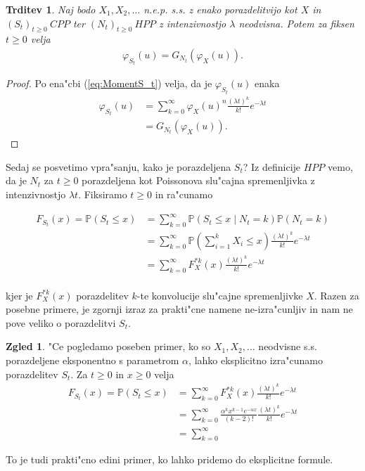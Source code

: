 \documentclass[12pt, a4paper, reqno]{amsart}
\theoremstyle{definition} %
\newtheorem{zgled}[definicija]{Zgled}
\theoremstyle{plain} %
\newtheorem{trditev}[definicija]{Trditev}
\newcommand{\Prob}{\mathbb{P}}
\newcommand{\1}{\mathds{1}}
\begin{document}
    \begin{trditev}
        Naj bodo $X_1, X_2, \dots$ n.e.p. s.s. z enako porazdelitvijo kot $X$ in
         $(S_t)_{t\geq 0}\ CPP$ ter $(N_t)_{t\geq 0}\ HPP$ z intenzivnostjo $\lambda$ neodvisna.
        Potem za fiksen $t\geq0$ velja
        \begin{align*}
            \varphi_{S_t}(u) = G_{N_t}\left(\varphi_{X}(u)\right).
        \end{align*}
        \label{trd:povezavaRodovneKarkateristicne}
    \end{trditev}

    \begin{proof}
        Po ena"cbi (\ref{eq:MomentS_t}) velja, da je $\varphi_{S_t}(u)$ enaka
        \begin{align*}
            \varphi_{S_t}(u) &= \sum_{k=0}^{\infty}
            \varphi_X(u)^n\frac{(\lambda t)^k}{k!}e^{-\lambda t} \\
            &= G_{N_t}\left(\varphi_X(u)\right).
        \end{align*}
    \end{proof}

    \noindent
    Sedaj se posvetimo vpra"sanju, kako je porazdeljena $S_t$? Iz definicije $HPP$ vemo, da je 
    $N_t$ za $t\geq0$ porazdeljena kot Poissonova slu"cajna spremenljivka z intenzivnostjo 
    $\lambda t$. Fiksiramo $t\geq0$ in ra"cunamo

    \begin{align*}
        F_{S_t}(x) = \Prob(S_t \leq x) 
        &= \sum_{k=0}^\infty \Prob(S_t \leq x \mid N_t = k)\Prob(N_t = k) \\
        & = \sum_{k=0}^\infty \Prob(\sum_{i=1}^k X_i \leq x)\frac{(\lambda t)^k}{k!}e^{-\lambda t} \\
        & = \sum_{k=0}^\infty F_X^{*k}(x)\frac{(\lambda t)^k}{k!}e^{-\lambda t} \\
    \end{align*}

    \noindent
    kjer je $F_X^{*k}(x)$ porazdelitev $k$-te konvolucije slu"cajne spremenljivke $X$. Razen za 
    posebne primere, je zgornji izraz za prakti"cne namene ne-izra"cunljiv in nam ne pove veliko o 
    porazdelitvi $S_t$. 
    
    \begin{zgled}
        "Ce pogledamo poseben primer, ko so $X_1, X_2, \dots$ neodvisne s.s. porazdeljene eksponentno 
        s parametrom $\alpha$, lahko eksplicitno izra"cunamo porazdelitev $S_t$. Za $t\geq 0$
        in $x \geq 0$ velja
        \begin{align*}
            F_{S_t}(x) = \Prob(S_t \leq x)
            &= \sum_{k=0}^\infty F_X^{*k}(x)\frac{(\lambda t)^k}{k!}e^{-\lambda t}\\
            &= \sum_{k=0}^\infty \frac{\alpha^kx^{k-1}e^{-\alpha x}}{(k-2)!}\frac{(\lambda t)^k}{k!}e^{-\lambda t}\\
            &= \sum_{k=0}^\infty
        \end{align*}

        To je tudi prakti"cno edini primer, ko lahko pridemo do eksplicitne formule.

    \end{zgled}
    
\end{document}
